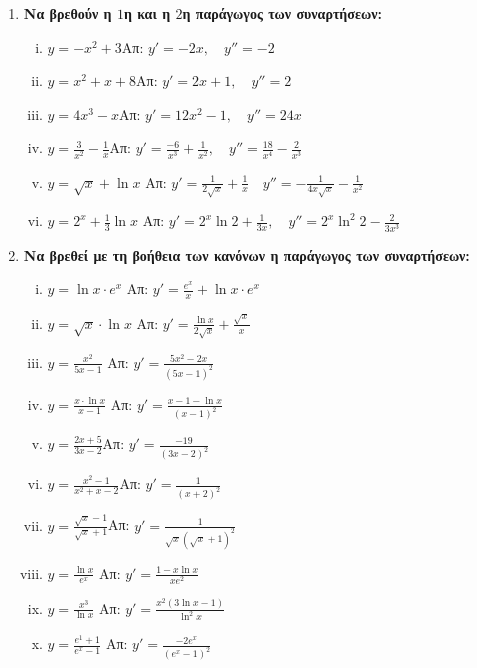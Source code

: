 \documentclass[a4paper,11pt]{article}
\begin{document}
\begin{center}
\end{center}

\vspace{1cm}



\begin{enumerate}
	\item {\bfseries Να βρεθούν η $1$η και η $2$η παράγωγος των συναρτήσεων:}
\begin{enumerate}[i)]
\item $y=-x^2+3$\hfill Απ: $y'=-2x,\quad y''=-2$
\item $y=x^2+x+8$\hfill Απ: $y'=2x+1,\quad y''=2$
\item $y= 4x^3-x$\hfill Απ: $y'=12x^2-1,\quad y''=24x$
\item $y= \frac{3}{x^{2}} -\frac{1}{x}$\hfill Απ: $y'=\frac{-6}{x^3}+\frac{1}{x^2},\quad y''= \frac{18}{x^4}-\frac{2}{x^3}$
\item $ y= \sqrt{ x } + \ln{x} $ \hfill Απ: $ y'= \frac{1}{2 \sqrt{ x }} + \frac{1}{x}\quad y''=-
	\frac{1}{4x \sqrt{ x }}- \frac{1}{x^{2}}  $ 
\item $ y = 2^{x} + \frac{1}{3} \ln{x} $ \hfill Απ: $ y' = 2^{x}\ln{2} + \frac{1}{3x}, \quad y'' =
	2^{x}\ln^{2}2 - \frac{2}{3x^{3}}  $
\end{enumerate}

\item {\bfseries Να βρεθεί με τη βοήθεια των κανόνων η παράγωγος των συναρτήσεων:}

\begin{enumerate}[i)]
	\item $ y= \ln{x} \cdot e^{x} $ \hfill Απ: $ y'= \frac{e^{x}}{x} + \ln{x}\cdot e^{x} $ 
	\item $ y= \sqrt{x}\cdot \ln{x} $ \hfill Απ: $ y'= \frac{\ln{x}}{2 \sqrt{ x }}  + 
		\frac{\sqrt{ x }}{x} $ 
	\item $ y= \frac{x^{2}}{5x-1} $ \hfill Απ: $ y'= \frac{5x^{2}-2x}{(5x-1)^{2}} $  
	\item $ y = \frac{x\cdot \ln{x}}{x-1} $ \hfill Απ: $ y' = \frac{x-1- \ln{x}}{(x-1)^{2}} $ 
\item $y=\frac{2x+5}{3x-2}$\hfill Απ: $y'=\frac{-19}{(3x-2)^2}$
\item $y=\frac{x^2-1}{x^2+x-2}$\hfill Απ: $y'=\frac{1}{(x+2)^2}$
\item $y=\frac{\sqrt{x}-1}{\sqrt{x}+1}$\hfill Απ: $y'=\frac{1}{\sqrt{x}(\sqrt{x}+1)^2}$
\item $ y= \frac{\ln{x}}{e^{x}} $ \hfill Απ: $ y'= \frac{1 - x \ln{x}}{xe^{2}} $ 
\item $ y= \frac{x^{3}}{\ln{x}} $ \hfill Απ: $ y' = \frac{x^{2}(3 \ln{x} -1)}{\ln^{2}{x} } $ 
\item $ y= \frac{e^{1}+1}{e^{x}-1} $ \hfill Απ: $ y'= \frac{-2e^{x}}{(e^{x}-1)^{2}} $ 
\end{enumerate}





\end{enumerate}
\end{document}
